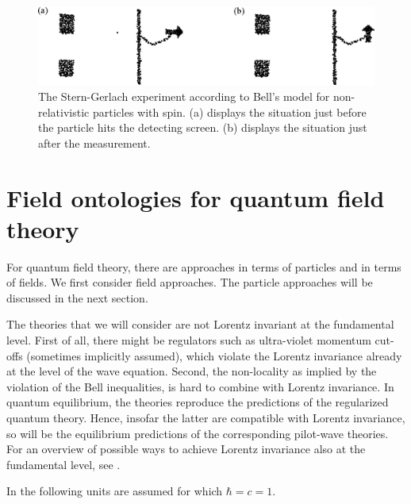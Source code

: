 \documentclass[12pt]{article}
\begin{document}
\begin{figure}
\begin{center}
\includegraphics{dbb.eps}
\end{center}
\caption{\label{dbb}The Stern-Gerlach experiment according to Bell's model for non-relativistic particles with spin. (a) displays the situation just before the particle hits the detecting screen. (b) displays the situation just after the measurement.}
\end{figure}
  


\section{Field ontologies for quantum field theory}\label{fields}
For quantum field theory, there are approaches in terms of particles and in terms of fields. We first consider field approaches. The particle approaches will be discussed in the next section.

The theories that we will consider are not Lorentz invariant at the fundamental level. First of all, there might be regulators such as ultra-violet momentum cut-offs (sometimes implicitly assumed), which violate the Lorentz invariance already at the level of the wave equation. Second, the non-locality as implied by the violation of the Bell inequalities, is hard to combine with Lorentz invariance. In quantum equilibrium, the theories reproduce the predictions of the regularized quantum theory. Hence, insofar the latter are compatible with Lorentz invariance, so will be the equilibrium predictions of the corresponding pilot-wave theories. For an overview of possible ways to achieve Lorentz invariance also at the fundamental level, see \cite{tumulka06}. 

In the following units are assumed for which $\hbar=c=1$.
\end{document}
